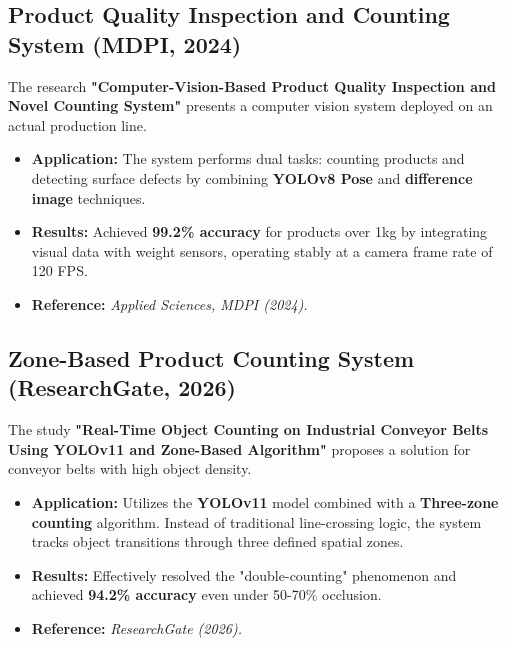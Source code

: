 \documentclass[12pt,a4paper]{report}
\begin{document}
\subsection{Product Quality Inspection and Counting System (MDPI, 2024)}
The research \textbf{"Computer-Vision-Based Product Quality Inspection and Novel Counting System"} presents a computer vision system deployed on an actual production line. 
\begin{itemize}
    \item \textbf{Application:} The system performs dual tasks: counting products and detecting surface defects by combining \textbf{YOLOv8 Pose} and \textbf{difference image} techniques.
    \item \textbf{Results:} Achieved \textbf{99.2\% accuracy} for products over 1kg by integrating visual data with weight sensors, operating stably at a camera frame rate of 120 FPS.
    \item \textbf{Reference:} \textit{Applied Sciences, MDPI (2024).}
\end{itemize}

\subsection{Zone-Based Product Counting System (ResearchGate, 2026)}
The study \textbf{"Real-Time Object Counting on Industrial Conveyor Belts Using YOLOv11 and Zone-Based Algorithm"} proposes a solution for conveyor belts with high object density.
\begin{itemize}
    \item \textbf{Application:} Utilizes the \textbf{YOLOv11} model combined with a \textbf{Three-zone counting} algorithm. Instead of traditional line-crossing logic, the system tracks object transitions through three defined spatial zones.
    \item \textbf{Results:} Effectively resolved the "double-counting" phenomenon and achieved \textbf{94.2\% accuracy} even under 50-70\% occlusion.
    \item \textbf{Reference:} \textit{ResearchGate (2026).}
\end{itemize}
\end{document}
